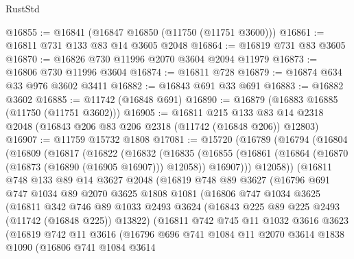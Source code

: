 \begin{lexlean}{RustStd}
\begin{coremodule}
@16855 := @16841 (@16847 @16850 (@11750 (@11751 @3600)))
@16861 := @16811 @731 @133 @83 @14 @3605 @2048
@16864 := @16819 @731 @83 @3605
@16870 := @16826 @730 @11996 @2070 @3604 @2094 @11979
@16873 := @16806 @730 @11996 @3604
@16874 := @16811 @728
@16879 := @16874 @634 @33 @976 @3602 @3411
@16882 := @16843 @691 @33 @691
@16883 := @16882 @3602
@16885 := @11742 (@16848 @691)
@16890 := @16879 (@16883 @16885 (@11750 (@11751 @3602)))
@16905 := @16811
    @215
    @133
    @83
    @14
    @2318
    @2048
    (@16843 @206 @83 @206 @2318 (@11742 (@16848 @206)) @12803)
@16907 := @11759 @15732 @1808
@17081 := @15720
    (@16789
      (@16794
        (@16804
          (@16809
            (@16817
              (@16822
                (@16832
                  (@16835
                    (@16855
                      (@16861 (@16864 (@16870 (@16873 (@16890 (@16905 @16907))) @12058)) @16907)))
                  @12058))
              (@16811
                @748
                @133
                @89
                @14
                @3627
                @2048
                (@16819
                  @748
                  @89
                  @3627
                  (@16796
                    @691
                    @747
                    @1034
                    @89
                    @2070
                    @3625
                    @1808
                    @1081
                    (@16806
                      @747
                      @1034
                      @3625
                      (@16811
                        @342
                        @746
                        @89
                        @1033
                        @2493
                        @3624
                        (@16843 @225 @89 @225 @2493 (@11742 (@16848 @225)) @13822)
                        (@16811
                          @742
                          @745
                          @11
                          @1032
                          @3616
                          @3623
                          (@16819
                            @742
                            @11
                            @3616
                            (@16796
                              @696
                              @741
                              @1084
                              @11
                              @2070
                              @3614
                              @1838
                              @1090
                              (@16806
                                @741
                                @1084
                                @3614

\end{coremodule}
\end{lexlean}
